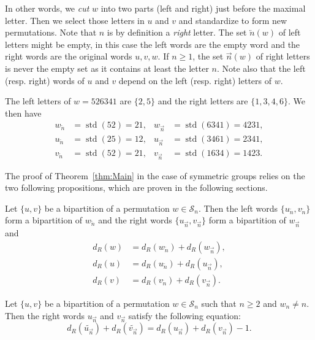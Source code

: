 \documentclass[Unicode]{cedram-alco}
\theoremstyle{definition}
\newcommand{\Sym}[1]{\mathcal{S}_{#1}}
\newcommand{\Symn}{\Sym{n}}
\DeclareMathOperator{\std}{std}
\newcommand{\dec}[1]{\widetilde{#1}}
\newcommand{\R}{{\overrightarrow{n}}}
\newcommand{\LL}{{\overleftarrow{n}}}
\newcommand{\dd}{d_R}
\begin{document}
In other words, we \emph{cut} $w$ into two parts (left and right) just before the maximal letter. Then we select those letters in $u$ and $v$ and standardize to form new permutations. Note that $n$ is by definition a \emph{right} letter. The set $\LL(w)$ of left letters might be empty, in this case the left words are the empty word and the right words are the original words $u,v,w$. If $n \geq 1$, the set $\R(w)$ of right letters is never the empty set as it contains at least the letter $n$.  Note also that the left (resp. right) words of $u$ and $v$ depend on the left (resp. right) letters of $w$. 


\begin{ex} The left letters of $w = 526341$ are $\lbrace 2, 5 \rbrace$ and the right letters are $\lbrace 1, 3, 4, 6 \rbrace$. We then have
\begin{align*}
w_\LL &= \std(52) = 21, & w_\R &= \std(6341) = 4231, \\
u_\LL &= \std(25) = 12, & u_\R &= \std(3461) = 2341,  \\
v_\LL &= \std(52) = 21, & v_\R &= \std(1634) = 1423. 
\end{align*}
\end{ex}


The proof of Theorem~\ref{thm:Main} in the case of symmetric groups relies on the two following propositions, which are proven in the following sections.

\begin{prop}
\label{prop:decomposition}
Let $\lbrace u, v \rbrace$ be a bipartition of a permutation $w \in \Symn$. Then the left words $\lbrace u_\LL, v_\LL \rbrace$ form a bipartition of $w_\LL$ and the right words $\lbrace u_\R, v_\R \rbrace$ form a bipartition of $w_\R$ and
\begin{align}
\label{eq:deswdecomp}
\dd(w) &= \dd(w_\LL) + \dd(w_\R), \\
\label{eq:desudecomp}
\dd(u) &= \dd(u_\LL) + \dd(u_\R), \\
\label{eq:desvdecomp}
\dd(v) &= \dd(v_\LL) + \dd(v_\R).
\end{align}
\end{prop}

\begin{prop}
\label{prop:decreasing}
Let $\lbrace u, v \rbrace$ be a bipartition of a permutation $w \in \Symn$ such that $n \geq 2$ and $w_n \neq n$. Then the right words $u_\R$ and $v_\R$ satisfy the following equation:
\begin{equation}
\label{eq:decreasing}
\dd(\dec{u_\R}) + \dd(\dec{v_\R}) = \dd(u_\R) + \dd(v_\R) -1.
\end{equation}
\end{prop}
\end{document}
